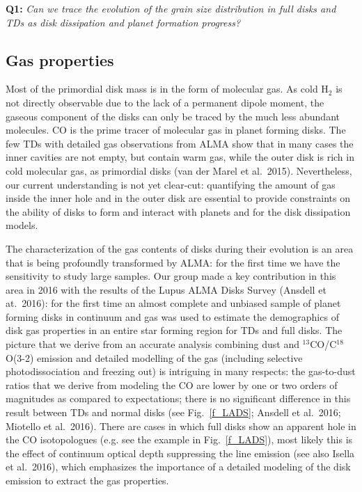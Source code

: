 \documentclass[10pt,fleqn,twoside]{article}
\begin{document}
\smallskip
{\bf Q1:} {\it Can we trace the evolution of the grain size distribution in full disks and TDs as disk dissipation and planet formation progress?}

\subsection{Gas properties}
Most of the primordial disk mass is in the form of molecular gas. As cold H$_2$ is not directly observable due to the lack of a permanent dipole moment, the gaseous component of the disks can only be traced by the much less abundant molecules. CO is the prime tracer of molecular gas in planet forming disks. The few TDs with detailed gas observations from ALMA show that in many cases the inner cavities are not empty, but contain warm gas, while the outer disk is rich in cold molecular gas, as primordial disks (van der Marel et al.~2015). Nevertheless, our current understanding is not yet clear-cut: quantifying the amount of gas inside the inner hole and in the outer disk are essential to provide constraints on the ability of disks to form and interact with planets and for the disk dissipation models.

The characterization of the gas contents of disks during their evolution is an area that is being profoundly transformed by ALMA: for the first time we have the sensitivity to study large samples.
Our group made a key contribution in this area in 2016 with the results of the Lupus ALMA Disks Survey
(Ansdell et at.~2016): for the first time an almost complete and unbiased sample of planet forming disks in continuum and gas was used to estimate the demographics of disk gas properties in an entire star forming region for TDs and full disks. The picture that we derive from an accurate analysis combining dust and $^{13}$CO/C$^{18}$O(3-2) emission and detailed modelling of the gas (including selective photodissociation and freezing out) is intriguing in many respects: the gas-to-dust ratios that we derive from modeling the CO are lower by one or two orders of magnitudes as compared to expectations; there is no significant difference in this result between TDs and normal disks (see Fig.~\ref{f_LADS}; Ansdell et al.~2016; Miotello et al.~2016). There are cases in which full disks show an apparent hole in the CO isotopologues (e.g. see the example in Fig.~\ref{f_LADS}), most likely this is the effect of continuum optical depth suppressing the line emission (see also Isella et al.~2016), which emphasizes the importance of a detailed modeling of the disk emission to extract the gas properties.
\end{document}

